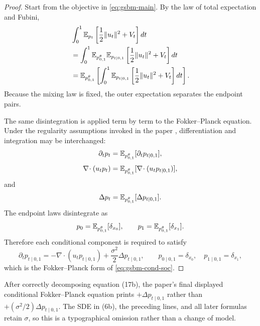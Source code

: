 \begin{proof}
Start from the objective in \eqref{eq:gsbm-main}.  By the law of total
expectation and Fubini,
\begin{align*}
 &\int_0^1\mathbb{E}_{p_t}
   \left[\frac12\|u_t\|^2+V_t\right]dt\\
 &=\int_0^1\mathbb{E}_{p_{0,1}^\theta}
   \mathbb{E}_{p_{t\mid0,1}}
   \left[\frac12\|u_t\|^2+V_t\right]dt\\
 &=\mathbb{E}_{p_{0,1}^\theta}
   \left[
     \int_0^1\mathbb{E}_{p_{t\mid0,1}}
     \left[\frac12\|u_t\|^2+V_t\right]dt
   \right].
\end{align*}
Because the mixing law is fixed, the outer expectation separates the endpoint
pairs.

The same disintegration is applied term by term to the Fokker--Planck equation.
Under the regularity assumptions invoked in the paper
\cite{Anderson1982,YongZhou1999}, differentiation and integration may be
interchanged:
\[
  \partial_t p_t
  =\mathbb{E}_{p_{0,1}^\theta}[\partial_t p_{t\mid0,1}],
\]
\[
  \nabla\!\cdot(u_t p_t)
  =\mathbb{E}_{p_{0,1}^\theta}
    [\nabla\!\cdot(u_t p_{t\mid0,1})],
\]
and
\[
  \Delta p_t
  =\mathbb{E}_{p_{0,1}^\theta}[\Delta p_{t\mid0,1}].
\]
The endpoint laws disintegrate as
\[
  p_0=\mathbb{E}_{p_{0,1}^\theta}[\delta_{x_0}],
  \qquad
  p_1=\mathbb{E}_{p_{0,1}^\theta}[\delta_{x_1}].
\]
Therefore each conditional component is required to satisfy
\[
  \partial_t p_{t\mid0,1}
  =-\nabla\!\cdot(u_t p_{t\mid0,1})
   +\frac{\sigma^2}{2}\Delta p_{t\mid0,1},
  \qquad
  p_{0\mid0,1}=\delta_{x_0},
  \quad
  p_{1\mid0,1}=\delta_{x_1},
\]
which is the Fokker--Planck form of \eqref{eq:gsbm-cond-soc}.
\end{proof}

\begin{remark}
After correctly decomposing equation (17b), the paper's final displayed
conditional Fokker--Planck equation prints $+\Delta p_{t\mid0,1}$ rather than
$+(\sigma^2/2)\Delta p_{t\mid0,1}$.  The SDE in (6b), the preceding lines, and
all later formulas retain $\sigma$, so this is a typographical omission rather
than a change of model.
\end{remark}


